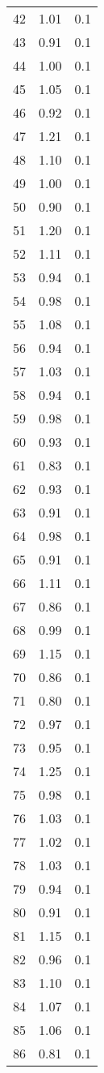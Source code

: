 \begin{table}
\begin{tabular}{ccc}
42 & 1.01 & 0.1 \\
43 & 0.91 & 0.1 \\
44 & 1.00 & 0.1 \\
45 & 1.05 & 0.1 \\
46 & 0.92 & 0.1 \\
47 & 1.21 & 0.1 \\
48 & 1.10 & 0.1 \\
49 & 1.00 & 0.1 \\
50 & 0.90 & 0.1 \\
51 & 1.20 & 0.1 \\
52 & 1.11 & 0.1 \\
53 & 0.94 & 0.1 \\
54 & 0.98 & 0.1 \\
55 & 1.08 & 0.1 \\
56 & 0.94 & 0.1 \\
57 & 1.03 & 0.1 \\
58 & 0.94 & 0.1 \\
59 & 0.98 & 0.1 \\
60 & 0.93 & 0.1 \\
61 & 0.83 & 0.1 \\
62 & 0.93 & 0.1 \\
63 & 0.91 & 0.1 \\
64 & 0.98 & 0.1 \\
65 & 0.91 & 0.1 \\
66 & 1.11 & 0.1 \\
67 & 0.86 & 0.1 \\
68 & 0.99 & 0.1 \\
69 & 1.15 & 0.1 \\
70 & 0.86 & 0.1 \\
71 & 0.80 & 0.1 \\
72 & 0.97 & 0.1 \\
73 & 0.95 & 0.1 \\
74 & 1.25 & 0.1 \\
75 & 0.98 & 0.1 \\
76 & 1.03 & 0.1 \\
77 & 1.02 & 0.1 \\
78 & 1.03 & 0.1 \\
79 & 0.94 & 0.1 \\
80 & 0.91 & 0.1 \\
81 & 1.15 & 0.1 \\
82 & 0.96 & 0.1 \\
83 & 1.10 & 0.1 \\
84 & 1.07 & 0.1 \\
85 & 1.06 & 0.1 \\
86 & 0.81 & 0.1 \\

\end{tabular}
\end{table}
